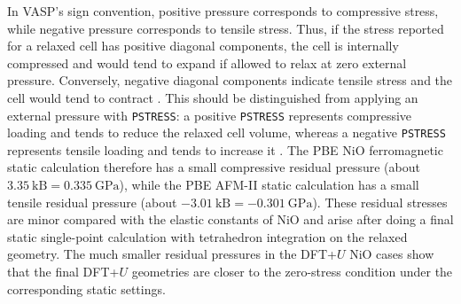 \begin{table}[h]
\centering
\caption{Task B relaxed structures and total energies.}
\end{table}

In VASP's sign convention, positive pressure corresponds to compressive stress,
while negative pressure corresponds to tensile stress.  Thus, if the stress
reported for a relaxed cell has positive diagonal components, the cell is
internally compressed and would tend to expand if allowed to relax at zero
external pressure.  Conversely, negative diagonal components indicate tensile
stress and the cell would tend to contract \cite{vasp-isif}.  This should be
distinguished from applying an external pressure with \texttt{PSTRESS}: a
positive \texttt{PSTRESS} represents compressive loading and tends to reduce
the relaxed cell volume, whereas a negative \texttt{PSTRESS} represents tensile
loading and tends to increase it \cite{vasp-pstress}.  The PBE NiO
ferromagnetic static calculation therefore has a small compressive residual
pressure (about \(3.35~\mathrm{kB}=0.335~\mathrm{GPa}\)), while the PBE AFM-II
static calculation has a small tensile residual pressure (about
\(-3.01~\mathrm{kB}=-0.301~\mathrm{GPa}\)).  These residual stresses are minor
compared with the elastic constants of NiO and arise after doing a final static
single-point calculation with tetrahedron integration on the relaxed geometry.
The much smaller residual pressures in the DFT+\(U\) NiO cases show that the
final DFT+\(U\) geometries are closer to the zero-stress condition under the
corresponding static settings.

